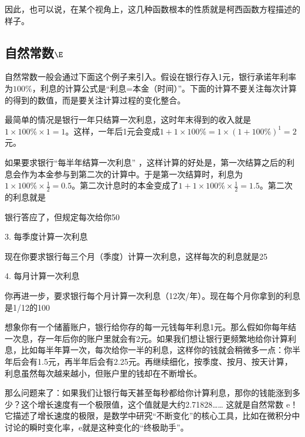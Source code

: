 因此，也可以说，在某个视角上，这几种函数根本的性质就是柯西函数方程描述的样子。

\subsection{自然常数$\E$}

自然常数一般会通过下面这个例子来引入。假设在银行存入1元，银行承诺年利率为$100\%$，利息的计算公式是“利息=本金（时间）”。下面的计算不要关注每次计算的得到的数值，而是要关注计算过程的变化整合。

最简单的情况是银行一年只结算一次利息，这时年末得到的收入就是$1\times100\%\times1=1$。这样，一年后1元会变成$1+1\times100\%=1\times(1+100\%)^1=2$元。

如果要求银行“每半年结算一次利息” ，这样计算的好处是，第一次结算之后的利息会作为本金参与到第二次的计算中。于是第一次结算时，利息为$1\times100\%\times\frac{1}{2}=0.5$。第二次计息时的本金变成了$1+1\times100\%\times\frac{1}{2}=1.5$。第二次的利息就是

银行答应了，但规定每次给你50%

3. 每季度计算一次利息

现在你要求银行每三个月（季度）计算一次利息，这样每次的利息就是25%

4. 每月计算一次利息

你再进一步，要求银行每个月计算一次利息（12次/年）。现在每个月你拿到的利息是1/12的100%



想象你有一个储蓄账户，银行给你存的每一元钱每年利息1元。那么假如你每年结一次息，存一年后你的账户里就会有2元。如果我们想让银行更频繁地给你计算利息，比如每半年算一次，每次给你一半的利息，这样你的钱就会稍微多一点：你半年后会有1.5元，再半年后会有2.25元。再继续细化，按季度、按月、按天计算，利息虽然每次越来越小，但账户里的钱却在不断增长。

那么问题来了：如果我们让银行每天甚至每秒都给你计算利息，那你的钱能涨到多少？这个增长速度有一个极限值，这个值就是大约2.71828…… 这就是自然常数 e！它描述了增长速度的极限，是数学中研究“不断变化”的核心工具，比如在微积分中讨论的瞬时变化率，e就是这种变化的“终极助手”。

